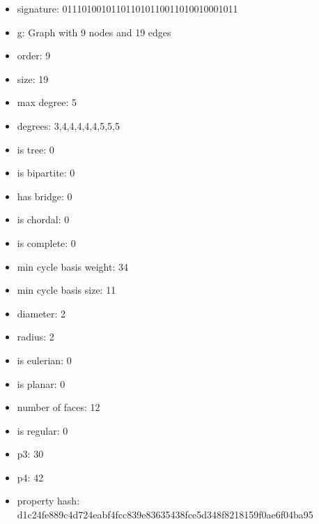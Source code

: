 \newpage
\begin{figure}
\end{figure}
\begin{itemize}
\item signature: 011101001011011010110011010010001011
\item g: Graph with 9 nodes and 19 edges
\item order: 9
\item size: 19
\item max degree: 5
\item degrees: 3,4,4,4,4,4,5,5,5
\item is tree: 0
\item is bipartite: 0
\item has bridge: 0
\item is chordal: 0
\item is complete: 0
\item min cycle basis weight: 34
\item min cycle basis size: 11
\item diameter: 2
\item radius: 2
\item is eulerian: 0
\item is planar: 0
\item number of faces: 12
\item is regular: 0
\item p3: 30
\item p4: 42
\item property hash: d1c24fe889c4d724eabf4fcc839e83635438fce5d348f8218159f0ae6f04ba95
\end{itemize}
